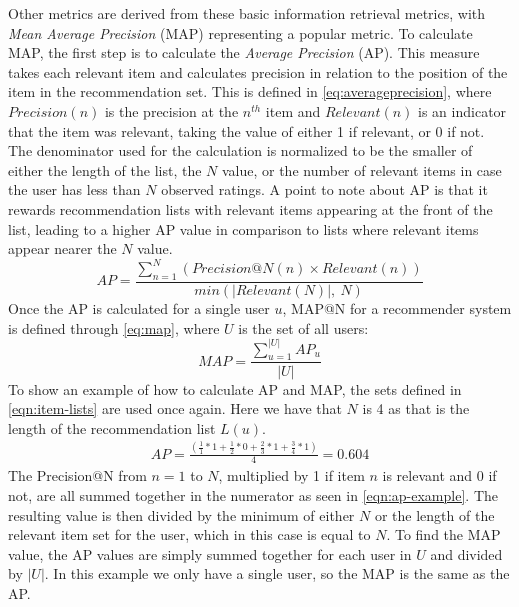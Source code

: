 Other metrics are derived from these basic information retrieval metrics, with \textit{Mean Average Precision} (MAP) representing a popular metric\cite{ChoosingMetricsEvaluation}.
To calculate MAP, the first step is to calculate the \textit{Average Precision} (AP).
This measure takes each relevant item and calculates precision in relation to the position of the item in the recommendation set.
This is defined in \autoref{eq:averageprecision}, where $Precision(n)$ is the precision at the $n^{th}$ item and $Relevant(n)$ is an indicator that the item was relevant, taking the value of either 1 if relevant, or 0 if not.
The denominator used for the calculation is normalized to be the smaller of either the length of the list, the $N$ value, or the number of relevant items in case the user has less than $N$ observed ratings.
A point to note about AP is that it rewards recommendation lists with relevant items appearing at the front of the list, leading to a higher AP value in comparison to lists where relevant items appear nearer the $N$ value. 
\begin{equation}
    \label{eq:averageprecision}
    AP = \frac{\sum\limits_{n=1}^N (Precision@N(n) \times Relevant(n))}{min(|Relevant(N)|,\:N)}
\end{equation}
Once the AP is calculated for a single user $u$, MAP@N for a recommender system is defined through \autoref{eq:map}, where $U$ is the set of all users: 
\begin{equation}
    \label{eq:map}
    MAP = \frac{\sum\limits_{u=1}^{|U|} AP_u}{|U|}
\end{equation}
To show an example of how to calculate AP and MAP, the sets defined in \autoref{eqn:item-lists} are used once again.
Here we have that $N$ is 4 as that is the length of the recommendation list $L(u)$.
\begin{align}
    AP = \frac{(\frac{1}{1}*1+\frac{1}{2}*0+\frac{2}{3}*1+\frac{3}{4}*1)}{4} = 0.604 \label{eqn:ap-example}
\end{align}
The Precision@N from $n=1$ to $N$, multiplied by 1 if item $n$ is relevant and 0 if not, are all summed together in the numerator as seen in \autoref{eqn:ap-example}.
The resulting value is then divided by the minimum of either $N$ or the length of the relevant item set for the user, which in this case is equal to $N$.
To find the MAP value, the AP values are simply summed together for each user in $U$ and divided by $|U|$.
In this example we only have a single user, so the MAP is the same as the AP.
\\\\
